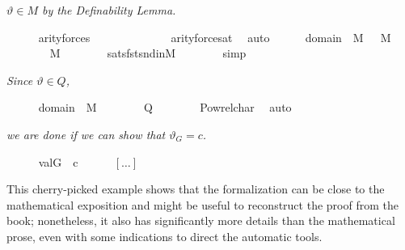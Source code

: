 \textit{$\vartheta \in M$ by the Definability Lemma.}
\begin{isabelle}
\ \ \ \ \isamarkupfalse%
\ {\isachardoublequoteopen}arity{\isacharparenleft}{\kern0pt}forces{\isacharparenleft}{\kern0pt}\ {\isasymcdot}{}\ {\isasymin}\ {}{\isasymcdot}\ {\isacharparenright}{\kern0pt}{\isacharparenright}{\kern0pt}\ {\isacharequal}{\kern0pt}\ {}{\isachardoublequoteclose}\isanewline
\ \ \ \ \ \ \isamarkupfalse%
\ arity{\isacharunderscore}{\kern0pt}forces{\isacharunderscore}{\kern0pt}at\ \isamarkupfalse%
\ auto\isanewline
\ \ \ \ \isamarkupfalse%
\ {\isacartoucheopen}domain{\isacharparenleft}{\kern0pt}{\isasymtau}{\isacharparenright}{\kern0pt}\ {\isasymin}\ M{\isacartoucheclose}\ {\isacartoucheopen}{\isasymchi}\ {\isasymin}\ M{\isacartoucheclose}\isanewline
\ \ \ \ \isamarkupfalse%
\ {\isachardoublequoteopen}{\isacharquery}{\kern0pt}{\isasymtheta}\ {\isasymin}\ M{\isachardoublequoteclose}\isanewline
\ \ \ \ \ \ \isamarkupfalse%
\ sats{\isacharunderscore}{\kern0pt}fst{\isacharunderscore}{\kern0pt}snd{\isacharunderscore}{\kern0pt}in{\isacharunderscore}{\kern0pt}M\isanewline
\ \ \ \ \ \ \isamarkupfalse%
\ simp\end{isabelle}
\textit{Since
  $\vartheta \in Q$,}
\begin{isabelle}
\ \ \ \ \isamarkupfalse%
\ {\isacartoucheopen}domain{\isacharparenleft}{\kern0pt}{\isasymtau}{\isacharparenright}{\kern0pt}{\isasymtimes}{\isasymbbbP}\ {\isasymin}\ M{\isacartoucheclose}\isanewline
\ \ \ \ \isamarkupfalse%
\ {\isachardoublequoteopen}{\isacharquery}{\kern0pt}{\isasymtheta}\ {\isasymin}\ {\isacharquery}{\kern0pt}Q{\isachardoublequoteclose}\isanewline
\ \ \ \ \ \ \isamarkupfalse%
\ Pow{\isacharunderscore}{\kern0pt}rel{\isacharunderscore}{\kern0pt}char\ \isamarkupfalse%
\ auto
\end{isabelle}
\textit{we are done if we can show that
  $\vartheta_{G}=c$.}
\begin{isabelle}
\ \ \ \ \isamarkupfalse%
\ {\isachardoublequoteopen}val{\isacharparenleft}{\kern0pt}G{\isacharcomma}{\kern0pt}{\isacharquery}{\kern0pt}{\isasymtheta}{\isacharparenright}{\kern0pt}\ {\isacharequal}{\kern0pt}\ c{\isachardoublequoteclose}\isanewline
%
\ \ \ \  \ \mbox{$[\dots]$}
\end{isabelle}

This cherry-picked example shows that the formalization can be close
to the mathematical exposition and might be useful to reconstruct the
proof from the book; nonetheless, it also has significantly more
details than the mathematical prose, even with some indications to
direct the automatic tools.

